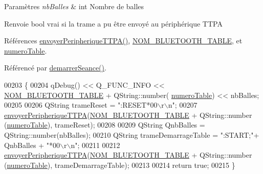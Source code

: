 \begin{DoxyParams}{Paramètres}
{\em nb\+Balles} & int Nombre de balles \\
\hline
\end{DoxyParams}
\begin{DoxyReturn}{Renvoie}
bool vrai si la trame a pu être envoyé au périphérique T\+T\+PA 
\end{DoxyReturn}


Références \hyperlink{class_communication_bluetooth_a73d95b841bf64a4463760435a41fc219}{envoyer\+Peripherique\+T\+T\+P\+A()}, \hyperlink{terminal-_t_t_p_a_2communicationbluetooth_8h_aa416b2be7573de0d7832248a27ba09a8}{N\+O\+M\+\_\+\+B\+L\+U\+E\+T\+O\+O\+T\+H\+\_\+\+T\+A\+B\+LE}, et \hyperlink{class_communication_bluetooth_a9428f8261f0cc055e9c6fed9a61cb595}{numero\+Table}.



Référencé par \hyperlink{class_communication_bluetooth_a546aae742ba77e90f99c4f12fbff908a}{demarrer\+Seance()}.


\begin{DoxyCode}
00203 \{
00204     qDebug() << Q\_FUNC\_INFO << \hyperlink{terminal-_t_t_p_a_2communicationbluetooth_8h_aa416b2be7573de0d7832248a27ba09a8}{NOM\_BLUETOOTH\_TABLE} + QString::number(
      \hyperlink{class_communication_bluetooth_a9428f8261f0cc055e9c6fed9a61cb595}{numeroTable}) << nbBalles;
00205 
00206     QString trameReset = \textcolor{stringliteral}{":RESET*00\(\backslash\)r\(\backslash\)n"};
00207     \hyperlink{class_communication_bluetooth_a73d95b841bf64a4463760435a41fc219}{envoyerPeripheriqueTTPA}(\hyperlink{terminal-_t_t_p_a_2communicationbluetooth_8h_aa416b2be7573de0d7832248a27ba09a8}{NOM\_BLUETOOTH\_TABLE} + QString::number
      (\hyperlink{class_communication_bluetooth_a9428f8261f0cc055e9c6fed9a61cb595}{numeroTable}), trameReset);
00208 
00209     QString QnbBalles = QString::number(nbBalles);
00210     QString trameDemarrageTable = \textcolor{stringliteral}{":START;"}+ QnbBalles + \textcolor{stringliteral}{"*00\(\backslash\)r\(\backslash\)n"};
00211 
00212     \hyperlink{class_communication_bluetooth_a73d95b841bf64a4463760435a41fc219}{envoyerPeripheriqueTTPA}(\hyperlink{terminal-_t_t_p_a_2communicationbluetooth_8h_aa416b2be7573de0d7832248a27ba09a8}{NOM\_BLUETOOTH\_TABLE} + QString::number
      (\hyperlink{class_communication_bluetooth_a9428f8261f0cc055e9c6fed9a61cb595}{numeroTable}), trameDemarrageTable);
00213 
00214     \textcolor{keywordflow}{return} \textcolor{keyword}{true};
00215 \}
\end{DoxyCode}
\mbox{\label{class_communication_bluetooth_ab11003b21b249385e466ac80b3a0b780}} 
